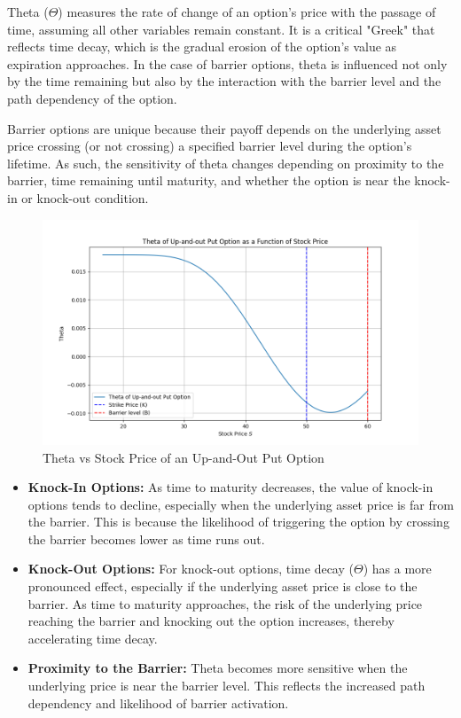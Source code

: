 Theta (\(\Theta\)) measures the rate of change of an option's price with the passage of time, assuming all other variables remain constant. It is a critical "Greek" that reflects time decay, which is the gradual erosion of the option's value as expiration approaches. In the case of barrier options, theta is influenced not only by the time remaining but also by the interaction with the barrier level and the path dependency of the option.

Barrier options are unique because their payoff depends on the underlying asset price crossing (or not crossing) a specified barrier level during the option's lifetime. As such, the sensitivity of theta changes depending on proximity to the barrier, time remaining until maturity, and whether the option is near the knock-in or knock-out condition.

\begin{figure}[h]
    \centering
    \includegraphics[width=.65\linewidth]{content/images/theta.png}
    \caption{Theta vs Stock Price of an Up-and-Out Put Option}
    \label{fig:theta_behavior}
\end{figure}

\begin{itemize}
    \item \textbf{Knock-In Options:} As time to maturity decreases, the value of knock-in options tends to decline, especially when the underlying asset price is far from the barrier. This is because the likelihood of triggering the option by crossing the barrier becomes lower as time runs out.
    
    \item \textbf{Knock-Out Options:} For knock-out options, time decay (\(\Theta\)) has a more pronounced effect, especially if the underlying asset price is close to the barrier. As time to maturity approaches, the risk of the underlying price reaching the barrier and knocking out the option increases, thereby accelerating time decay.
    
    \item \textbf{Proximity to the Barrier:} Theta becomes more sensitive when the underlying price is near the barrier level. This reflects the increased path dependency and likelihood of barrier activation.
\end{itemize}

